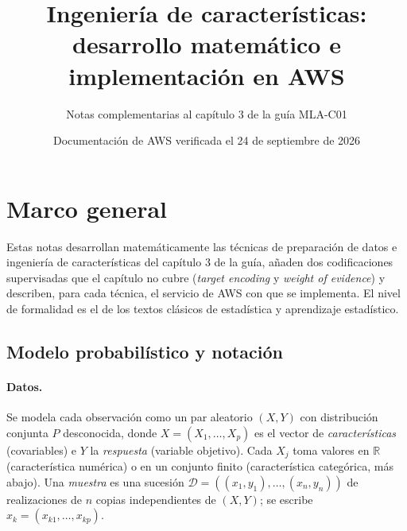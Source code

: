 \documentclass[11pt,a4paper]{article}
\title{Ingeniería de características:\\ desarrollo matemático e implementación en AWS}
\author{Notas complementarias al capítulo 3 de la guía MLA-C01}
\date{Documentación de AWS verificada el 24 de septiembre de 2026}
\theoremstyle{plain}
\theoremstyle{definition}
\theoremstyle{remark}
\newcommand{\R}{\mathbb{R}}
\newcommand{\1}{\mathbf{1}}
\begin{document}
\maketitle
\tableofcontents
\newpage

\section{Marco general}

Estas notas desarrollan matemáticamente las técnicas de preparación de
datos e ingeniería de características del capítulo 3 de la guía, añaden
dos codificaciones supervisadas que el capítulo no cubre (\emph{target
encoding} y \emph{weight of evidence}) y describen, para cada técnica, el
servicio de AWS con que se implementa. El nivel de formalidad es el de los
textos clásicos de estadística y aprendizaje estadístico.

\subsection{Modelo probabilístico y notación}\label{sec:notacion}

\paragraph{Datos.} Se modela cada observación como un par aleatorio
$(X,Y)$ con distribución conjunta $P$ desconocida, donde
$X=(X_1,\dots,X_p)$ es el vector de \emph{características} (covariables)
e $Y$ la \emph{respuesta} (variable objetivo). Cada $X_j$ toma valores en
$\R$ (característica numérica) o en un conjunto finito (característica
categórica, más abajo). Una \emph{muestra} es una sucesión
$\mathcal D=((x_1,y_1),\dots,(x_n,y_n))$ de realizaciones de $n$ copias
independientes de $(X,Y)$; se escribe $x_k=(x_{k1},\dots,x_{kp})$.
\end{document}
